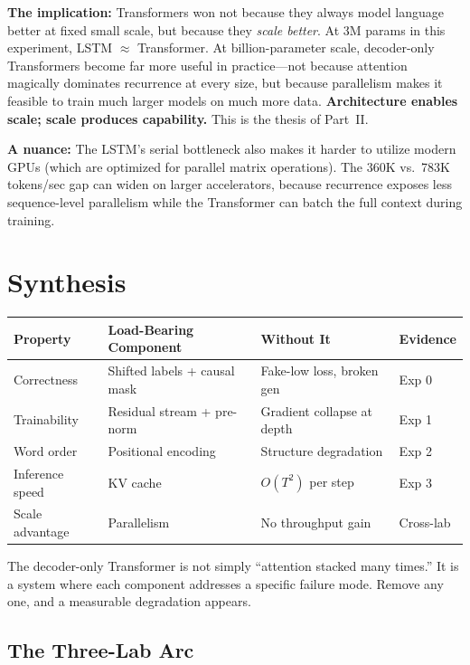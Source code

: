 \textbf{The implication:} Transformers won not because they always model language better at fixed small scale, but because they \emph{scale better}. At 3M params in this experiment, LSTM $\approx$ Transformer. At billion-parameter scale, decoder-only Transformers become far more useful in practice---not because attention magically dominates recurrence at every size, but because parallelism makes it feasible to train much larger models on much more data. \textbf{Architecture enables scale; scale produces capability.} This is the thesis of Part~II.

\textbf{A nuance:} The LSTM's serial bottleneck also makes it harder to utilize modern GPUs (which are optimized for parallel matrix operations). The 360K vs.\ 783K tokens/sec gap can widen on larger accelerators, because recurrence exposes less sequence-level parallelism while the Transformer can batch the full context during training.

\section{Synthesis}

\begin{center}
\begin{tabular}{llll}
\toprule
\textbf{Property} & \textbf{Load-Bearing Component} & \textbf{Without It} & \textbf{Evidence} \\
\midrule
Correctness & Shifted labels + causal mask & Fake-low loss, broken gen & Exp 0 \\
Trainability & Residual stream + pre-norm & Gradient collapse at depth & Exp 1 \\
Word order & Positional encoding & Structure degradation & Exp 2 \\
Inference speed & KV cache & $O(T^2)$ per step & Exp 3 \\
Scale advantage & Parallelism & No throughput gain & Cross-lab \\
\bottomrule
\end{tabular}
\end{center}

The decoder-only Transformer is not simply ``attention stacked many times.'' It is a system where each component addresses a specific failure mode. Remove any one, and a measurable degradation appears.

\subsection{The Three-Lab Arc}

